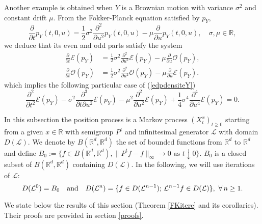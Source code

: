 \documentclass[a4paper, 11pt]{article}
\newcommand{\R}{\mathbb{R}}
\newcommand{\1}{\mathbf{1}}
\begin{document}
\noindent Another example is obtained when $Y$ is a Brownian motion with variance $\sigma^2$ and constant drift $\mu$. From the Fokker-Planck equation satisfied by $p_Y,$ 
\begin{equation*}
\frac{\partial}{\partial t}p_Y(t,0,u)=\frac{1}{2}\sigma^2\frac{\partial^2}{\partial u^2}p_Y(t,0,u)-\mu\frac{\partial}{\partial u}p_Y(t,0,u),\quad \sigma,\mu\in \R,
\end{equation*}
we deduce that its even and odd parts satisfy the system 
\begin{align*}
\frac{\partial}{\partial t}\mathcal{E}(p_Y)&=\frac{1}{2}\sigma^2\frac{\partial^2}{\partial u^2}\mathcal{E}(p_Y)-\mu\frac{\partial}{\partial u}\mathcal{O}(p_Y),\\
\frac{\partial}{\partial t}\mathcal{O}(p_Y)&=\frac{1}{2}\sigma^2\frac{\partial^2}{\partial u^2}\mathcal{O}(p_Y)-\mu\frac{\partial}{\partial u}\mathcal{E}(p_Y).
\end{align*}
which implies the following particular case of (\ref{edpdensiteY}) 
\begin{equation*}
\frac{\partial^2}{\partial t^2}\mathcal{E}(p_Y)-\sigma^2\frac{\partial^3}{\partial t\partial u^2}\mathcal{E}(p_Y)-\mu^2\frac{\partial^2}{\partial u^2}\mathcal{E}(p_Y)+\frac{1}{4}\sigma^4\frac{\partial^4}{\partial u^4}\mathcal{E}(p_Y)=0.
\end{equation*}

\bigskip


\bigskip

\noindent  In this subsection the position process is a Markov process $(X_t^x)_{t\geq 0}$ starting from a given $x\in \R$ with semigroup $P^t$ and infinitesimal generator $\mathcal{L}$ with domain $D(\mathcal{L})$. We denote by $B(\R^d,\R^d)$ the set of bounded functions from $\R^d$ to $\R^d$ and define $B_0:=\{f \in B(\R^d,\R^d), \|P^tf-f\|_\infty \rightarrow 0 \text{\ as\ } t\downarrow 0\}$. $B_0$ is a closed subset of $B(\R^d,\R^d)$ containing $D(\mathcal{L})$. In the following, we will use iterations of $\mathcal{L}$:
\begin{equation*}
D(\mathcal{L}^0)=B_0 \text{\quad and\quad}
D(\mathcal{L}^n)=\{f\in D(\mathcal{L}^{n-1});\,  \mathcal{L}^{n-1}f\in D(\mathcal{L})\},\, \, \forall\, n\geq 1.
\end{equation*}


\noindent We state below the results of this section (Theorem \ref{FKitere} and its corollaries). Their proofs are provided in section \ref{proofs}. 
\end{document}
